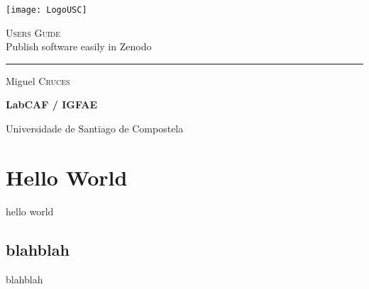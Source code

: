 \documentclass[a4paper]{article}
\begin{document}

\begin{centering}
    \begin{minipage}[c]{0.4\linewidth}
        \centering
    \texttt{[image: LogoUSC]}
    \end{minipage}
    
    	\vspace{1.5cm}
        {\huge \textsc{Users Guide} \\ Publish software easily in Zenodo\par}
    	\vspace{0.25cm}
    
    	
    	\noindent\rule{\textwidth}{1pt}
    	\vspace{0.5cm}
        
        Miguel \textsc{Cruces}
    	
    	\vspace{0.5cm}
    	{\large\bfseries LabCAF / IGFAE  \par Universidade de Santiago de Compostela}
    
    	\vspace{1cm}
\end{centering}

\tableofcontents

\section{Hello World}

hello world

\subsection{blahblah}

blahblah
\end{document}
